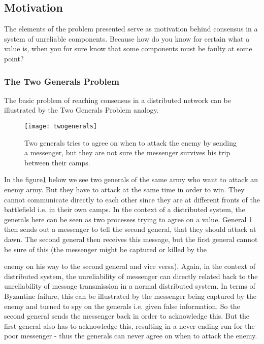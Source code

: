\subsection{Motivation}
The elements of the problem presented serve as motivation behind consensus in a system of unreliable components. Because how do you know for certain what a value is, when you for sure know that some components must be faulty at some point?

\subsubsection{The Two Generals Problem}
The basic problem of reaching consensus in a distributed network can be illustrated by the Two Generals Problem analogy.

\begin{figure}[h]
	\centering
	\texttt{[image: twogenerals]}
	\caption{Two generals tries to agree on when to attack the enemy by sending a messenger, but they are not sure the messenger survives his trip between their camps.}
	\label{generals}
\end{figure}

In the figure\ref{generals} below we see two generals of the same army who want to attack an enemy army. But they have to attack at the same time in order to win. They cannot communicate directly to each other since they are at different fronts of the battlefield i.e. in their own camps. In the context of a distributed system, the generals here can be seen as two processes trying to agree on a value.
General 1 then sends out a messenger to tell the second general, that they should attack at dawn. The second general then receives this message, but the first general cannot be sure of this (the messenger might be captured or killed by the

enemy on his way to the second general and vice versa). Again, in the context of distributed system, the unreliability of messenger can directly related back to the unreliability of message transmission in a normal distributed system. In terms of Byzantine failure, this can be illustrated by the messenger being captured by the enemy and turned to spy on the generals i.e. given false information.
So the second general sends the messenger back in order to acknowledge this. But the first general also has to acknowledge this, resulting in a never ending run for the poor messenger - thus the generals can never agree on when to attack the enemy.

